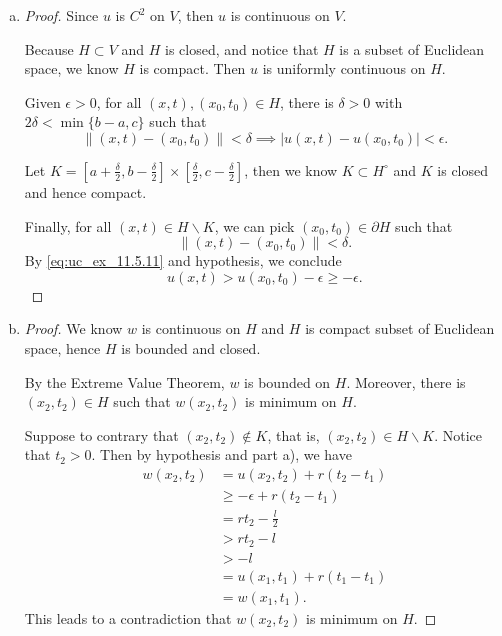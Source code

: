 \begin{Exercise}
\begin{enumerate}[a)]
\item
\begin{proof}
Since $u$ is $C^2$ on $V$, then $u$ is continuous on $V$.

Because $H\subset V$ and $H$ is closed, and notice that $H$ is a subset of Euclidean space, we know $H$ is compact. Then $u$ is uniformly continuous on $H$.

Given $\epsilon>0$, for all $(x,t),(x_0,t_0)\in H$, there is $\delta>0$ with $2\delta<\min\{b-a,c\}$ such that
\begin{equation}
\|(x,t)-(x_0,t_0)\|<\delta \implies |u(x,t)-u(x_0,t_0)|<\epsilon. \label{eq:uc_ex_11.5.11}
\end{equation}

Let $K=\left[a+\frac{\delta}{2},b-\frac{\delta}{2}\right]\times\left[\frac{\delta}{2},c-\frac{\delta}{2}\right]$, then we know $K\subset H^{\circ}$ and $K$ is closed and hence compact.

Finally, for all $(x,t)\in H\backslash K$, we can pick $(x_0,t_0)\in \partial H$ such that 
$$
\|(x,t)-(x_0,t_0)\|<\delta.
$$
By \eqref{eq:uc_ex_11.5.11} and hypothesis, we conclude
$$
u(x,t) > u(x_0,t_0)-\epsilon \geq -\epsilon.
$$
\end{proof}

\item
\begin{proof}
We know $w$ is continuous on $H$ and $H$ is compact subset of Euclidean space, hence $H$ is bounded and closed.

By the Extreme Value Theorem, $w$ is bounded on $H$. Moreover, there is $(x_2,t_2)\in H$ such that $w(x_2,t_2)$ is minimum on $H$.

Suppose to contrary that $(x_2,t_2)\notin K$, that is, $(x_2,t_2)\in H \backslash K$. Notice that $t_2>0$. Then by hypothesis and part a), we have
\begin{align*}
w(x_2,t_2)
&= u(x_2,t_2) + r(t_2-t_1) \\
&\geq -\epsilon+r(t_2-t_1) \\
&=r t_2-\frac{l}{2} \\
&> r t_2 - l \\
&> -l \\
&= u(x_1,t_1) + r(t_1-t_1) \\
&= w(x_1,t_1).
\end{align*}
This leads to a contradiction that $w(x_2,t_2)$ is minimum on $H$.


\end{proof}
\end{enumerate}
\end{Exercise}

